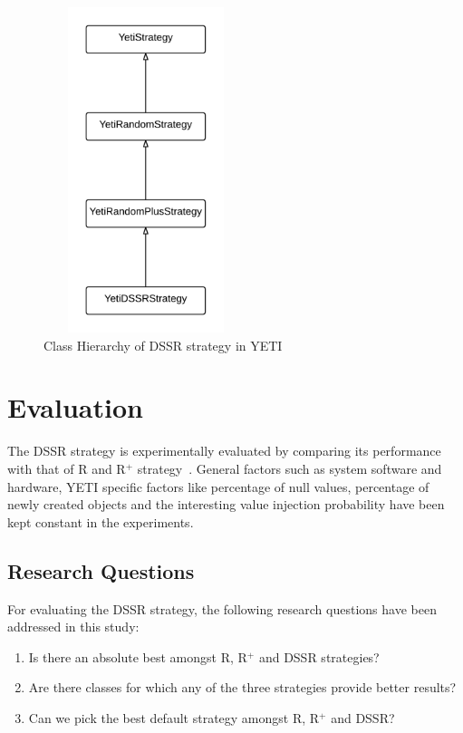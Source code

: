 \begin{figure}[h]
\centering
\includegraphics[width=6cm,height=9.5cm]{chapter4/classHierarchy1.png}
\caption{Class Hierarchy of DSSR strategy in YETI}
\label{fig:hierarchyofDSSR}
\end{figure}






\section{Evaluation}\label{sec:eval}

The DSSR strategy is experimentally evaluated by comparing its performance with that of R and R$^+$ strategy~\cite{ciupa2007experimental, ciupa2008finding}. General factors such as system software and hardware, YETI specific factors like percentage of null values, percentage of newly created objects and the interesting value injection probability have been kept constant in the experiments.

\subsection{Research Questions}
For evaluating the DSSR strategy, the following research questions have been addressed in this study:
\begin{enumerate}
\item Is there an absolute best amongst R, R$^+$ and DSSR strategies?
\item Are there classes for which any of the three strategies provide better results?
\item Can we pick the best default strategy amongst R, R$^+$ and DSSR?
\end{enumerate}



